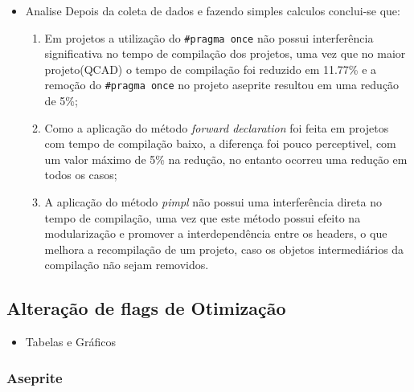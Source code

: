\begin{itemize}
    \item Analise
    \subitem Depois da coleta de dados e fazendo simples calculos conclui-se que:

    \begin{enumerate}
       \item Em projetos a utilização do \texttt{\#pragma once} não possui interferência
 significativa no tempo de compilação dos projetos, uma vez que no maior
 projeto(QCAD) o tempo de compilação foi reduzido em 11.77\% e a remoção
 do \texttt{\#pragma once} no projeto aseprite resultou em uma redução de 5\%;
        \item Como a aplicação do método \textit{forward declaration} foi feita em projetos 
com tempo de compilação baixo, a diferença foi pouco perceptivel,
 com um valor máximo de 5\% na redução, no entanto ocorreu uma redução em todos os casos;
        \item A aplicação do método \textit{pimpl} não possui uma interferência direta
 no tempo de compilação, uma vez que este método possui efeito na modularização
 e promover a interdependência entre os headers, o que melhora a recompilação de
 um projeto, caso os objetos intermediários da compilação não sejam removidos.
    \end{enumerate}
\end{itemize}

\clearpage
\subsection{Alteração de flags de Otimização}

\begin{itemize}
    \item Tabelas e Gráficos
\end{itemize}

\subsubsection*{Aseprite}


